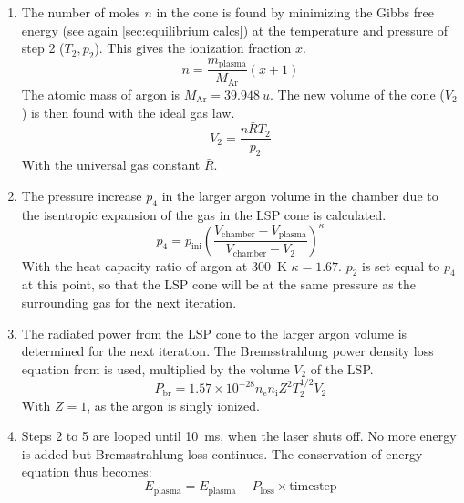 \begin{enumerate}
            \item The number of moles $n$ in the cone is found by minimizing the Gibbs free energy (see again \autoref{sec:equilibrium calcs}) at the temperature and pressure of step 2 ($T_2, p_2$). This gives the ionization fraction $x$.
                \begin{equation}
                    n = \frac{m_\mathrm{plasma}}{M_\mathrm{Ar}}(x + 1)
                \end{equation}
                The atomic mass of argon is $M_\mathrm{Ar} = \qty{39.948}{u}$. The new volume of the cone ($V_2$) is then found with the ideal gas law.
                \begin{equation}
                    V_2 = \frac{n \bar{R} T_2}{p_2}
                \end{equation}
                With the universal gas constant $\bar{R}$.
            \item The pressure increase $p_4$ in the larger argon volume in the chamber due to the isentropic expansion of the gas in the LSP cone is calculated.
                \begin{equation}
                    p_4 = p_\mathrm{ini} \left(\frac{V_\mathrm{chamber} - V_\mathrm{plasma}}{V_\mathrm{chamber} - V_2}\right)^\kappa
                \end{equation}
                With the heat capacity ratio of argon at \qty{300}{K} $\kappa=1.67$. $p_2$ is set equal to $p_4$ at this point, so that the LSP cone will be at the same pressure as the surrounding gas for the next iteration.
            \item The radiated power from the LSP cone to the larger argon volume is determined for the next iteration. The Bremsstrahlung power density loss equation from \textcite{glasstoneControlledThermonuclearReactions1975} is used, multiplied by the volume $V_2$ of the LSP.
                \begin{equation}
                    P_\mathrm{br} = 1.57 \times 10^{-28} n_\mathrm{e} n_\mathrm{i} Z^2 T_2^{1/2} V_2
                \end{equation}
                With $Z = 1$, as the argon is singly ionized.
            \item Steps 2 to 5 are looped until \qty{10}{ms}, when the laser shuts off. No more energy is added but Bremsstrahlung loss continues. The conservation of energy equation thus becomes:
                \begin{equation}
                    E_\mathrm{plasma} = E_\mathrm{plasma} - P_\mathrm{loss} \times \mathrm{timestep}
                \end{equation}
        \end{enumerate}
        
